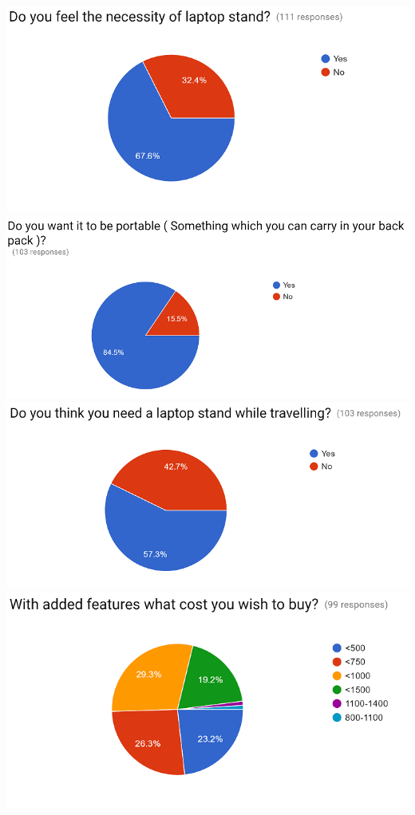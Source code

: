 \includegraphics[width=\linewidth]{sur4}
\includegraphics[width=\linewidth]{sur5}
\includegraphics[width=\linewidth]{sur6}
\includegraphics[width=\linewidth]{sur7}

